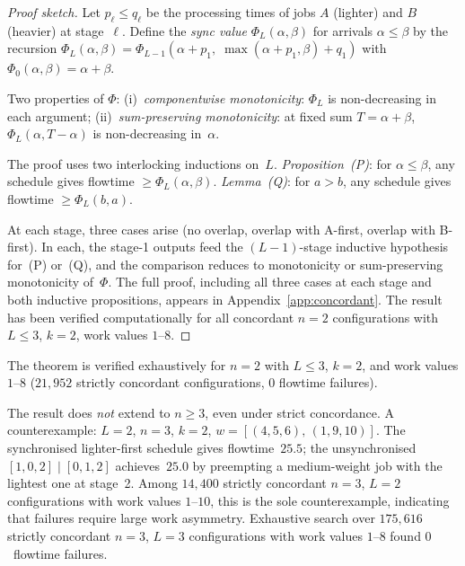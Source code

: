 \documentclass[11pt,titlepage]{article}
\begin{document}
\begin{proof}[Proof sketch]
Let $p_\ell \leq q_\ell$ be the processing times of jobs
$A$ (lighter) and $B$ (heavier) at stage~$\ell$. Define the
\emph{sync value} $\Phi_L(\alpha,\beta)$ for arrivals
$\alpha \leq \beta$ by the recursion
$\Phi_L(\alpha,\beta) = \Phi_{L-1}(\alpha + p_1,\;
\max(\alpha + p_1, \beta) + q_1)$ with
$\Phi_0(\alpha,\beta) = \alpha + \beta$.

Two properties of $\Phi$: (i)~\emph{componentwise
monotonicity}: $\Phi_L$ is non-decreasing in each argument;
(ii)~\emph{sum-preserving monotonicity}: at fixed sum
$T = \alpha + \beta$, $\Phi_L(\alpha, T{-}\alpha)$ is
non-decreasing in~$\alpha$.

The proof uses two interlocking inductions on~$L$.
\emph{Proposition~(P)}: for $\alpha \leq \beta$, any
schedule gives flowtime $\geq \Phi_L(\alpha,\beta)$.
\emph{Lemma~(Q)}: for $a > b$, any schedule gives flowtime
$\geq \Phi_L(b, a)$.

At each stage, three cases arise (no overlap, overlap with
A-first, overlap with B-first). In each, the stage-1 outputs
feed the $(L{-}1)$-stage inductive hypothesis for~(P) or~(Q),
and the comparison reduces to monotonicity or
sum-preserving monotonicity of~$\Phi$. The full proof,
including all three cases at each stage and both inductive
propositions, appears in
Appendix~\ref{app:concordant}. The result
has been verified computationally for all concordant $n = 2$
configurations with $L \leq 3$, $k = 2$, work values
$1$--$8$.
\end{proof}

The theorem is verified exhaustively for $n = 2$ with
$L \leq 3$, $k = 2$, and work values $1$--$8$
($21{,}952$ strictly concordant configurations,
$0$ flowtime failures).

The result does \emph{not} extend to $n \geq 3$, even
under strict concordance. A counterexample: $L = 2$,
$n = 3$, $k = 2$, $w = [(4,5,6),\,(1,9,10)]$. The
synchronised lighter-first schedule gives flowtime~$25.5$;
the unsynchronised $[1,0,2] \mid [0,1,2]$ achieves~$25.0$
by preempting a medium-weight job with the lightest one at
stage~2. Among $14{,}400$ strictly concordant $n = 3$,
$L = 2$ configurations with work values $1$--$10$, this is
the sole counterexample, indicating that failures require
large work asymmetry. Exhaustive search over $175{,}616$
strictly concordant $n = 3$, $L = 3$ configurations with
work values $1$--$8$ found $0$~flowtime failures.
\end{document}
